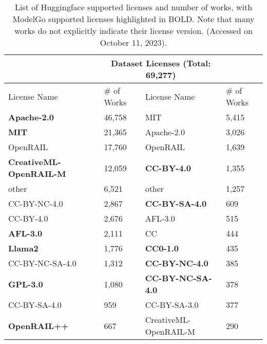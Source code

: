\begin{table*}[]
    \caption{List of Huggingface supported licenses and number of works, with ModelGo supported licenses highlighted in BOLD. Note that many works do not explicitly indicate their license version. (Accessed on October 11, 2023). }
    \footnotesize
    \label{tab:stats}
    \begin{tabular}{|ll||ll|}
    \hline
    \rowcolor[gray]{.8} 
    \multicolumn{2}{|c||}{Model Licenses (Total: 355,150)}     & \multicolumn{2}{c|}{Dataset Licenses (Total: 69,277)}   \\ \hline
    \multicolumn{1}{|l|}{License Name} & \# of Works & \multicolumn{1}{l|}{License Name} & \# of Works \\ \hline
    \multicolumn{1}{|l|}{\textbf{Apache-2.0}} & 46,758 & \multicolumn{1}{l|}{MIT} & 5,415 \\ \hline
    \multicolumn{1}{|l|}{\textbf{MIT}} & 21,365 & \multicolumn{1}{l|}{Apache-2.0} & 3,026 \\ \hline %
    \multicolumn{1}{|l|}{OpenRAIL} & 17,760 & \multicolumn{1}{l|}{OpenRAIL} & 1,639 \\ \hline
    \multicolumn{1}{|l|}{\textbf{CreativeML-OpenRAIL-M}} & 12,059 & \multicolumn{1}{l|}{\textbf{CC-BY-4.0}} & 1,355 \\ \hline
    \multicolumn{1}{|l|}{other} & 6,521 & \multicolumn{1}{l|}{other} & 1,257 \\ \hline
    \multicolumn{1}{|l|}{CC-BY-NC-4.0} & 2,867 & \multicolumn{1}{l|}{\textbf{CC-BY-SA-4.0}} & 609 \\ \hline
    \multicolumn{1}{|l|}{CC-BY-4.0} & 2,676 & \multicolumn{1}{l|}{AFL-3.0} & 515 \\ \hline
    \multicolumn{1}{|l|}{\textbf{AFL-3.0}} & 2,111 & \multicolumn{1}{l|}{CC} & 444 \\ \hline
    \multicolumn{1}{|l|}{\textbf{Llama2}} & 1,776 & \multicolumn{1}{l|}{\textbf{CC0-1.0}} & 435 \\ \hline
    \multicolumn{1}{|l|}{CC-BY-NC-SA-4.0} & 1,312 & \multicolumn{1}{l|}{\textbf{CC-BY-NC-4.0}} & 385 \\ \hline
    \multicolumn{1}{|l|}{\textbf{GPL-3.0}} & 1,080 & \multicolumn{1}{l|}{\textbf{CC-BY-NC-SA-4.0}} & 378 \\ \hline
    \multicolumn{1}{|l|}{CC-BY-SA-4.0} & 959 & \multicolumn{1}{l|}{CC-BY-SA-3.0} & 377 \\ \hline
    \multicolumn{1}{|l|}{\textbf{OpenRAIL++}} & 667 & \multicolumn{1}{l|}{CreativeML-OpenRAIL-M} & 290 \\ \hline

\end{tabular}
\end{table*}
